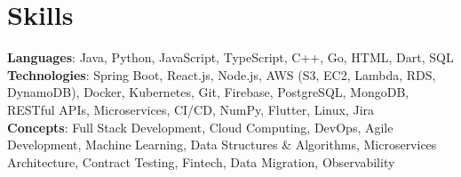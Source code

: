 \documentclass[letterpaper,11pt]{article}
\begin{document}
\section{Skills}
 \begin{itemize}[leftmargin=0.15in, label={}]
    \small{\item{
     \textbf{Languages}{: Java, Python, JavaScript, TypeScript, C++, Go, HTML, Dart, SQL} \\
     \textbf{Technologies}{: Spring Boot, React.js, Node.js, AWS (S3, EC2, Lambda, RDS, DynamoDB), Docker, Kubernetes, Git, Firebase, PostgreSQL, MongoDB, RESTful APIs, Microservices, CI/CD, NumPy, Flutter, Linux, Jira} \\
     \textbf{Concepts}{: Full Stack Development, Cloud Computing, DevOps, Agile Development, Machine Learning, Data Structures \& Algorithms, Microservices Architecture, Contract Testing, Fintech, Data Migration, Observability} }}
 \end{itemize}
 
%
\end{document}
